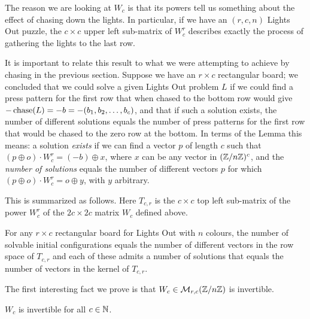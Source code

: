 
The reason we are looking at $W_{c}$ is that its powers tell us something about
the effect of chasing down the lights. In particular, if we have an $(r, c, n)$
Lights Out puzzle, the $c \times c$ upper left sub-matrix of
$W_{c}^{r}$ describes exactly the process of gathering the lights
to the last row.

It is important to relate this result to what we were attempting
to achieve by chasing in the previous section. Suppose we have an
$r\times c$ rectangular board; we concluded that we could solve
a given Lights Out problem $L$ if we could find a press pattern for
the first row that when chased to the bottom row would give
$-\operatorname{chase}(L)=-b=-(b_1, b_2, \ldots, b_c)$, and that if such a solution
exists, the number of different solutions equals the number of
press patterns for the first row that would be chased to the zero
row at the bottom. In terms of the Lemma this means: a solution {\it exists}
if we can find a vector $p$ of length $c$ such that $(p\oplus o)\cdot W_c^r=
(-b)\oplus x$, where $x$ can be any vector in $(\mathbb{Z}/n\mathbb{Z})^c$, and the
{\it number of solutions} equals the number of different vectors $p$
for which $(p\oplus o)\cdot W_c^r=o\oplus y$, with $y$ arbitrary.

This is summarized as follows. Here
$T_{c, r}$ is the $c\times c$ top left
sub-matrix of the power $W_c^r$ of
the $2c\times 2c$ matrix $W_c$ 
defined above.
\begin{corollary}\label{cor:numbers}
For any $r\times c$ rectangular board for Lights Out with
$n$ colours, the number of solvable initial configurations
equals the number of different vectors in the row space
of $T_{c, r}$ and each of these admits a number of solutions
that equals the number of vectors in the kernel of $T_{c, r}$.
\end{corollary}
%
The first interesting fact we prove is that $W_{c}\in\mathcal{M}_{r,c}(\mathbb{Z}/n\mathbb{Z})$
is invertible.

\begin{lemma}
  $W_{c}$ is invertible for all $c\in\mathbb{N}$.
\end{lemma}

